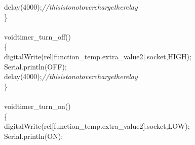 \documentclass[a4paper, 12pt]{article}
\newcommand\SPC{\hspace*{0.6em}}
\newcommand\QOT{\mbox{\char 34}}
\newcommand{\CppAComment}[1]{\textit{\textcolor[rgb]{0.2,0.4,1}{#1}}}
\newcommand{\CppAIdentifier}[1]{\textcolor[rgb]{0,1,0}{#1}}
\newcommand{\CppANumber}[1]{\textcolor[rgb]{0,0,1}{#1}}
\newcommand{\CppAReservedWord}[1]{\textcolor[rgb]{0,0.5,0}{#1}}
\newcommand{\CppASpace}[1]{\textcolor[rgb]{1,1,1}{\colorbox[rgb]{0,0,0}{#1}}}
\newcommand{\CppAString}[1]{\textcolor[rgb]{0.76,0.76,0.76}{#1}}
\newcommand{\CppASymbol}[1]{\textcolor[rgb]{1,0,0}{#1}}
\begin{document}
\begin{ttfamily}
\CppASpace{\SPC \SPC \SPC \SPC \SPC \SPC }\CppAIdentifier{delay}\CppASpace{\SPC }\CppASymbol{(}\CppANumber{4000}\CppASymbol{)}\CppASymbol{;}\CppASpace{\SPC \SPC \SPC \SPC \SPC \SPC \SPC \SPC \SPC \SPC \SPC \SPC \SPC \SPC \SPC \SPC \SPC \SPC \SPC \SPC \SPC \SPC \SPC \SPC \SPC \SPC \SPC \SPC \SPC \SPC \SPC \SPC \SPC \SPC \SPC \SPC \SPC }\CppAComment{//this\SPC is\SPC to\SPC not\SPC overcharge\SPC the\SPC relay}\\
\CppASpace{\SPC \SPC }\CppASymbol{\}}\\
\\
\CppAReservedWord{void}\CppASpace{\SPC }\CppAIdentifier{timer\_turn\_off}\CppASymbol{(}\CppASymbol{)}\\
\CppASymbol{\{}\\
\CppASpace{\SPC \SPC \SPC \SPC \SPC \SPC }\CppAIdentifier{digitalWrite}\CppASymbol{(}\CppASpace{\SPC }\CppAIdentifier{rel}\CppASymbol{[}\CppAIdentifier{function\_temp}\CppASymbol{.}\CppAIdentifier{extra\_value2}\CppASymbol{]}\CppASymbol{.}\CppAIdentifier{socket}\CppASpace{\SPC }\CppASymbol{,}\CppASpace{\SPC }\CppAIdentifier{HIGH}\CppASymbol{)}\CppASymbol{;}\\
\CppASpace{\SPC \SPC \SPC \SPC \SPC \SPC }\CppAIdentifier{Serial}\CppASymbol{.}\CppAIdentifier{println}\CppASymbol{(}\CppAString{\QOT OFF\QOT }\CppASymbol{)}\CppASymbol{;}\\
\CppASpace{\SPC \SPC \SPC \SPC \SPC \SPC }\CppAIdentifier{delay}\CppASpace{\SPC }\CppASymbol{(}\CppANumber{4000}\CppASymbol{)}\CppASymbol{;}\CppASpace{\SPC \SPC \SPC \SPC \SPC \SPC \SPC \SPC \SPC \SPC \SPC \SPC \SPC \SPC \SPC \SPC \SPC \SPC \SPC \SPC \SPC \SPC \SPC \SPC \SPC \SPC \SPC \SPC \SPC \SPC \SPC \SPC \SPC \SPC \SPC \SPC \SPC }\CppAComment{//this\SPC is\SPC to\SPC not\SPC overcharge\SPC the\SPC relay}\\
\CppASpace{\SPC \SPC }\CppASymbol{\}}\\
\\
\CppAReservedWord{void}\CppASpace{\SPC }\CppAIdentifier{timer\_turn\_on}\CppASymbol{(}\CppASymbol{)}\\
\CppASymbol{\{}\\
\CppASpace{\SPC \SPC \SPC \SPC \SPC \SPC }\CppAIdentifier{digitalWrite}\CppASymbol{(}\CppASpace{\SPC }\CppAIdentifier{rel}\CppASymbol{[}\CppAIdentifier{function\_temp}\CppASymbol{.}\CppAIdentifier{extra\_value2}\CppASymbol{]}\CppASymbol{.}\CppAIdentifier{socket}\CppASpace{\SPC }\CppASymbol{,}\CppASpace{\SPC }\CppAIdentifier{LOW}\CppASymbol{)}\CppASymbol{;}\\
\CppASpace{\SPC \SPC \SPC \SPC \SPC \SPC }\CppAIdentifier{Serial}\CppASymbol{.}\CppAIdentifier{println}\CppASymbol{(}\CppAString{\QOT ON\QOT }\CppASymbol{)}\CppASymbol{;}\\

\end{ttfamily}
\end{document}
